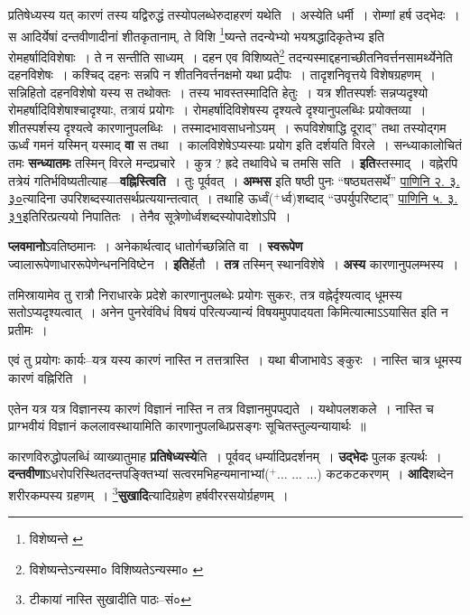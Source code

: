 \documentclass[article,12pt,a4paper]{memoir}
\newcommand{\add}[1]{($^{+}$#1)}
\begin{document}
	प्रतिषेध्यस्य यत् कारणं तस्य यद्विरुद्धं तस्योपलब्धेरुदाहरणं यथेति । अस्येति धर्मी । रोम्णां हर्ष उद्भेदः । स आदिर्येषां दन्तवीणादीनां शीतकृतानाम्, ते विशि \footnote{विशेष्यन्ते \cite{dp-msB}}ष्यन्ते तदन्येभ्यो भयश्रद्धादिकृतेभ्य इति रोमहर्षादिविशेषाः । ते न सन्तीति साध्यम् । दहन एव विशिष्यते\footnote{विशेष्यन्तेऽन्यस्मा० \cite{dp-msB} विशिष्यतेऽन्यस्मा० \cite{dp-msC} \cite{dp-msD}} तदन्यस्माद्दहनाच्छीतनिवर्त्तनसामर्थ्येनेति दहनविशेषः । कश्चिद् दहनः सन्नपि न शीतनिवर्त्तनक्षमो यथा प्रदीपः । तादृशनिवृत्तये विशेषग्रहणम् । सन्निहितो दहनविशेषो यस्य स तथोक्तः । तस्य भावस्तस्मादिति हेतुः । यत्र शीतस्पर्शः सन्नप्यदृश्यो रोमहर्षादिविशेषाश्चादृश्याः, तत्रायं प्रयोगः । रोमहर्षादिविशेषस्य दृश्यत्वे दृश्यानुपलब्धिः प्रयोक्तव्या । शीतस्पर्शस्य दृश्यत्वे कारणानुपलब्धिः । तस्मादभावसाधनोऽयम् । रूपविशेषाद्धि दूराद्” तथा तस्योद्गम ऊर्ध्वं गमनं यस्मिन् यस्माद् \textbf{वा} स तथा । कालविशेषेऽप्यस्याः प्रयोग इति दर्शयति विरले । सन्ध्याकालोचितं तमः \textbf{सन्ध्यातमः} तस्मिन् विरले मन्दप्रचारे । कुत्र ? ह्रदे तथाविधे च तमसि सति । \textbf{इति}स्तस्माद् । वह्नेरपि तत्रेयं गतिर्भविष्यतीत्याह—\textbf{वह्निस्त्विति} । तुः पूर्ववत् । \textbf{अम्भस} इति षष्ठी पुनः “षष्ठ्यतसर्थे” \href{http://http://sarit.indology.info/?cref=Pā.2.3.30}{पाणिनि २. ३. ३०}त्यादिना उपरिशब्दस्यातसर्थप्रत्ययान्तत्वात् । तथाहि ऊर्ध्वं\add{र्ध्व}शब्दाद् “उपर्युपरिष्टाद्” \href{http://http://sarit.indology.info/?cref=Pā.5.3.31}{पाणिनि ५. ३. ३१}इतिरित्प्रत्ययो निपातितः । तेनैव सूत्रेणोर्ध्वशब्दस्योपादेशोऽपि ।
	\pend
      

	  \pstart \textbf{प्लवमानो}ऽवतिष्ठमानः । अनेकार्थत्वाद् धातोर्गच्छन्निति वा । \textbf{स्वरूपेण} ज्वालारूपेणाधाररूपेणेन्धननिविष्टेन । \textbf{इति}र्हेतौ । \textbf{तत्र} तस्मिन् स्थानविशेषे । \textbf{अस्य} कारणानुपलम्भस्य ।
	\pend
      

	  \pstart तमिस्रायामेव तु रात्रौ निराधारके प्रदेशे कारणानुपलब्धेः प्रयोगः सुकरः, तत्र वह्नेर्दृश्यत्वाद् धूमस्य सतोऽप्यदृश्यत्वात् । अनेन पुनरेवंविधं विषयं परित्यज्यान्यं विषयमुपपादयता किमित्यात्माऽऽयासित इति न प्रतीमः ।
	\pend
      

	  \pstart एवं तु प्रयोगः कार्यः--यत्र यस्य कारणं नास्ति न तत्तत्रास्ति । यथा बीजाभावेऽ ङ्कुरः । नास्ति चात्र धूमस्य कारणं वह्निरिति ।
	\pend
      

	  \pstart एतेन यत्र यत्र विज्ञानस्य कारणं विज्ञानं नास्ति न तत्र विज्ञानमुपपद्यते । यथोपलशकले । नास्ति च प्राग्भवीयं विज्ञानं कललावस्थायामिति कारणानुपलब्धिप्रसङ्गः सूचितस्तुल्यन्यायार्थः ॥
	\pend
      

	  \pstart कारणविरुद्धोपलब्धिं व्याख्यातुमाह \textbf{प्रतिषेध्यस्ये}ति । पूर्ववद् धर्म्यादिप्रदर्शनम् । \textbf{उद्भेदः} पुलक इत्यर्थः । \textbf{दन्तवीणा}ऽधरोपरिस्थितदन्तपङ्क्तिभ्यां सत्वरमभिहन्यमानाभ्यां\add{... ... ...} कटकटकरणम् । \textbf{आदि}शब्देन शरीरकम्पस्य ग्रहणम् । \footnote{टीकायां नास्ति सुखादीति पाठः--सं०}\textbf{सुखादि}त्यादिग्रहेण हर्षवीररसयोर्ग्रहणम् ।
	\pend
      \leavevmode{}
	  \bigskip
	  \begingroup
	
\end{document}
